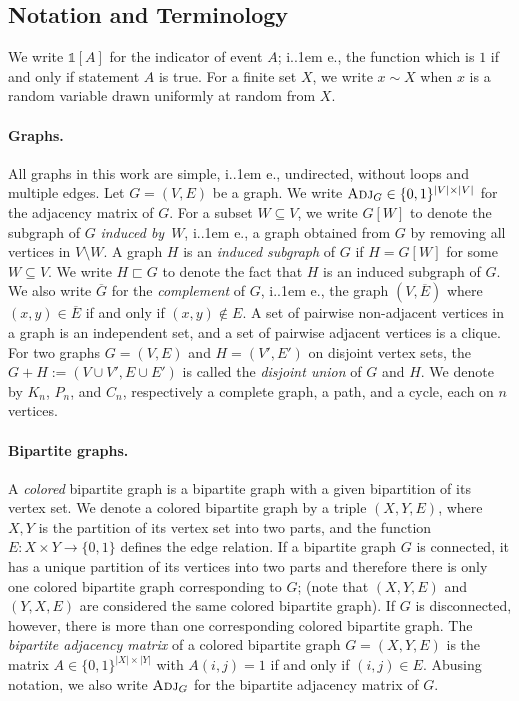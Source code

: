 \documentclass{article}
\makeatletter
\newcommand{\ind}[1]{\mathds{1} \left[ #1 \right] }
\newcommand{\zo}{\{0,1\}}
\newcommand{\Adj}{\textsc{Adj}}
\newcommand*\ie{i.\kern.1em e.\@\xspace} %
\makeatother
\begin{document}
\subsection{Notation and Terminology}
\label{section:notation}

We write $\ind{A}$ for the indicator of event $A$; \ie, the function which is $1$ if and only if
statement $A$ is true. For a finite set $X$, we write $x \sim X$ when $x$ is a random variable drawn
uniformly at random from $X$.

\paragraph{Graphs.}
All graphs in this work are simple, \ie, undirected, without loops and multiple edges.  Let
$G=(V,E)$ be a graph. We write $\Adj_G \in \zo^{|V| \times |V|}$ for the adjacency matrix of $G$.
For a subset $W \subseteq V$, we write $G[W]$ to denote the subgraph of $G$ \emph{induced by}~$W$,
\ie, a graph obtained from $G$ by removing all vertices in $V \setminus W$.  A graph $H$ is an
\emph{induced subgraph} of $G$ if $H = G[W]$ for some $W \subseteq V$.  We write $H \sqsubset G$ to
denote the fact that $H$ is an induced subgraph of $G$.  We also write $\overline G$ for the
\emph{complement} of $G$, \ie, the graph $(V,\overline E)$ where $(x,y)\in \overline E$ if and only
if $(x,y)\notin E$.  A set of pairwise non-adjacent vertices in a graph is an independent set, and a
set of pairwise adjacent vertices is a clique.
%
For two graphs $G = (V, E)$ and $H = (V', E')$ on disjoint vertex sets, the $G + H := (V \cup V', E
\cup E')$ is called the \emph{disjoint union} of $G$ and $H$.
%
We denote by $K_n$, $P_n$, and $C_n$, respectively a complete graph, a path, and a cycle, each on
$n$ vertices.

\paragraph{Bipartite graphs.}
A \emph{colored} bipartite graph is a bipartite graph with a given bipartition of its vertex set.
We denote a colored bipartite graph by a triple $(X,Y,E)$, where $X,Y$ is the partition of its
vertex set into two parts, and the function $E : X \times Y \to \zo$ defines the edge relation. If a
bipartite graph $G$ is connected, it has a unique partition of its vertices into two parts and
therefore there is only one colored bipartite graph corresponding to $G$; (note that $(X,Y,E)$ and
$(Y,X,E)$ are considered the same colored bipartite graph).  If $G$ is disconnected, however, there
is more than one corresponding colored bipartite graph.  The \emph{bipartite adjacency matrix} of a
colored bipartite graph $G = (X,Y,E)$ is the matrix $A \in \zo^{|X| \times |Y|}$ with $A(i,j) = 1$
if and only if $(i,j) \in E$. Abusing notation, we also write $\Adj_G$ for the bipartite adjacency
matrix of $G$.
\end{document}
